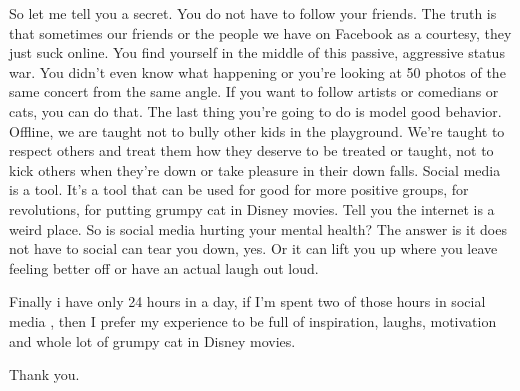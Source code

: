 \documentclass[UTF8,12pt,a4paper]{article}
\theoremstyle{Problem}
\theoremstyle{Solution}
\begin{document}
\begin{appendix}
    So let me tell you a secret. You do not have to follow your friends. The truth is that sometimes our friends or the people we have on Facebook as a courtesy, they just suck online. You find yourself in the middle of this passive, aggressive status war. You didn't even know what happening or you're looking at 50 photos of the same concert from the same angle.  If you want to follow artists or comedians or cats, you can do that. The last thing you're going to do is model good behavior. Offline, we are taught not to bully other kids in the playground. We're taught to respect others and treat them how they deserve to be treated or taught, not to kick others when they're down or take pleasure in their down falls. Social media is a tool. It's a tool that can be used for good for more positive groups, for revolutions, for putting grumpy cat in Disney movies. Tell you the internet is a weird place. So is social media hurting your mental health? The answer is it does not have to social can tear you down, yes. Or it can lift you up where you leave feeling better off or have an actual laugh out loud. 
    
    Finally i have only 24 hours in a day, if I'm spent two of those hours in social media , then I prefer my experience to be full of inspiration, laughs, motivation and whole lot of grumpy cat in Disney movies. 
    
    Thank you.
\end{appendix}

\end{document}
